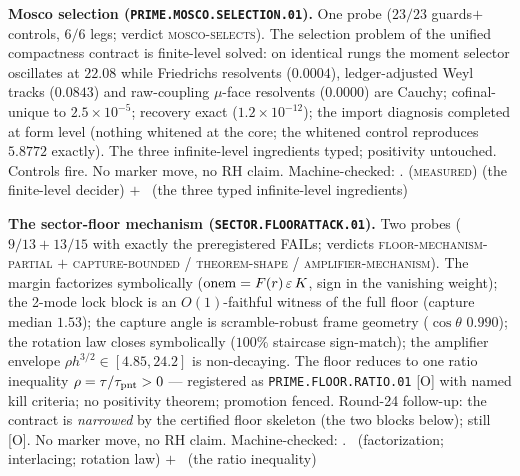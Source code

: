\par\smallskip\noindent\textbf{Mosco selection
(\texttt{PRIME.MOSCO.SELECTION.01}).}
One probe ($23/23$ guards$+$controls, $6/6$ legs; verdict
\textsc{mosco-selects}).  The selection problem of the unified
compactness contract is finite-level solved: on identical rungs
the moment selector oscillates at $22.08$ while Friedrichs
resolvents ($0.0004$), ledger-adjusted Weyl tracks ($0.0843$) and
raw-coupling $\mu$-face resolvents ($0.0000$) are Cauchy;
cofinal-unique to $2.5\times10^{-5}$; recovery exact
($1.2\times10^{-12}$); the import diagnosis completed at form
level (nothing whitened at the core; the whitened control
reproduces $5.8772$ exactly).  The three infinite-level
ingredients typed; positivity untouched.  Controls fire.  No
marker move, no RH claim.
Machine-checked: .
(\textsc{measured}) (the finite-level decider) $+$ \mO\ (the three
typed infinite-level ingredients)
\par\smallskip


\par\smallskip\noindent\textbf{The sector-floor mechanism
(\texttt{SECTOR.FLOORATTACK.01}).}
Two probes ($9/13+13/15$ with exactly the preregistered FAILs;
verdicts \textsc{floor-mechanism-partial} $+$
\textsc{capture-bounded} / \textsc{theorem-shape} /
\textsc{amplifier-mechanism}).  The margin factorizes symbolically
(${\rm onem}=F(r)\,\varepsilon\,K$, sign in the vanishing weight);
the 2-mode lock block is an $O(1)$-faithful witness of the full
floor (capture median $1.53$); the capture angle is
scramble-robust frame geometry ($\cos\theta$ $0.990$); the
rotation law closes symbolically ($100\%$ staircase sign-match);
the amplifier envelope $\rho h^{3/2}\in[4.85,24.2]$ is
non-decaying.  The floor reduces to one ratio inequality
$\rho=\tau/\tau_{\rm pnt}>0$ --- registered as
\texttt{PRIME.FLOOR.RATIO.01} [O] with named kill criteria; no
positivity theorem; promotion fenced.  Round-24 follow-up: the
contract is \emph{narrowed} by the certified floor skeleton
(the two blocks below); still [O].  No marker move, no RH
claim.
Machine-checked: .
\mE\ (factorization; interlacing; rotation law) $+$ \mO\ (the
ratio inequality)
\par\smallskip


